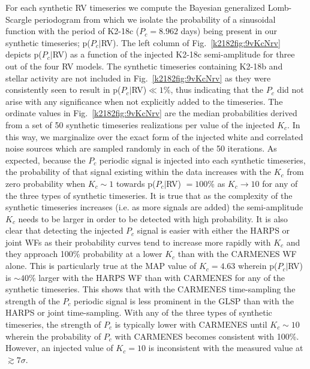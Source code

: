 For each synthetic RV timeseries we compute the Bayesian generalized Lomb-Scargle periodogram
\citep[GLSP;][]{mortier15} from which we isolate the probability of a sinusoidal function with the period of
K2-18c ($P_c=8.962$ days) being present in our synthetic timeseries; p($P_c|$RV).
The left column of Fig.~\ref{k2182fig:9vKcNrv} depicts p($P_c|$RV) as a function of the injected K2-18c semi-amplitude for
three out of the four RV models. 
The synthetic timeseries containing K2-18b and stellar activity are not included in Fig.~\ref{k2182fig:9vKcNrv} as
they were consistently seen to result in p($P_c|$RV)$\ll 1$\%, thus indicating that the $P_c$ did not arise with any
significance when not explicitly added to the timeseries. The ordinate values in
Fig.~\ref{k2182fig:9vKcNrv} are the median probabilities derived from a set of 50 synthetic timeseries realizations
per value of the injected $K_c$. In this way, we marginalize over the exact form of the injected white and correlated
noise sources which are sampled randomly in each of the 50 iterations.
As expected, because the $P_c$ periodic signal is injected into each synthetic timeseries,
the probability of that signal existing within the data increases with the $K_c$ from  zero probability
when $K_c\sim 1$ \mps{} towards p($P_c|$RV) $= 100$\% as $K_c \to 10$ \mps{} for any of the three types of synthetic
timeseries. It is true that as the complexity of the synthetic timeseries
increases (i.e. as more signals are added) the semi-amplitude $K_c$ needs to be larger in order to be
detected with high probability. It is also clear that detecting the injected $P_c$ signal is easier with either
the HARPS or joint WFs as their probability curves tend to increase more rapidly with $K_c$
and they approach 100\% probability at a lower $K_c$ than with the CARMENES WF alone. This is
particularly true at the MAP value of $K_c=4.63$ \mps{}  wherein
p($P_c|$RV) is $\sim 40$\% larger with the HARPS WF than with CARMENES for any of the synthetic
timeseries. This shows that with the CARMENES time-sampling 
the strength of the $P_c$ periodic signal is less prominent in the GLSP than with the HARPS or
joint time-sampling. With any of the three types of synthetic timeseries, the strength
of $P_c$ is typically lower with CARMENES until $K_c\sim 10$ \mps{} wherein the probability
of $P_c$ with CARMENES becomes consistent with 100\%. However, an injected value of $K_c=10$ \mps{} is
inconsistent with the  measured value at $\gtrsim 7\sigma$.

